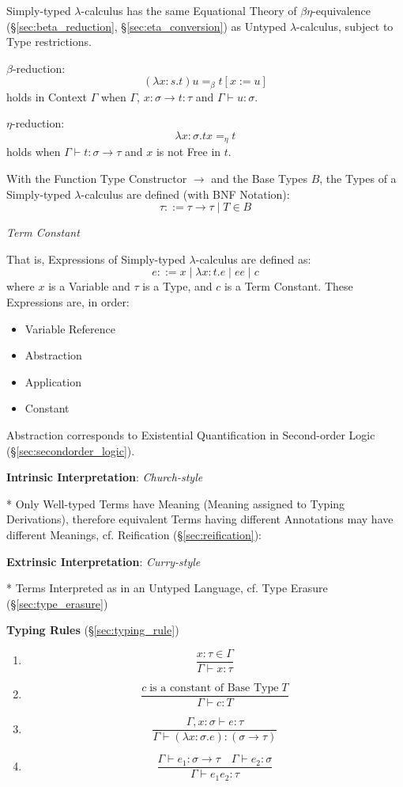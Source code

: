 Simply-typed $\lambda$-calculus has the same Equational Theory of
$\beta\eta$-equivalence (\S\ref{sec:beta_reduction},
\S\ref{sec:eta_conversion}) as Untyped $\lambda$-calculus, subject to
Type restrictions.

$\beta$-reduction:
\[
  (\lambda x:s.t)u =_\beta t[x := u]
\]
holds in Context $\Gamma$ when $\Gamma$, $x:\sigma \rightarrow t:\tau$
and $\Gamma \vdash u:\sigma$.

$\eta$-reduction:
\[
  \lambda x:\sigma .t x =_\eta t
\]
holds when $\Gamma \vdash t : \sigma \rightarrow \tau$ and $x$ is not
Free in $t$.

With the Function Type Constructor $\rightarrow$ and the Base Types
$B$, the Types of a Simply-typed $\lambda$-calculus are defined (with
BNF Notation):
\[
  \tau ::= \tau \rightarrow \tau \;|\; T \in B
\]

\emph{Term Constant}

That is, Expressions of Simply-typed $\lambda$-calculus are defined
as:
\[
  e ::= x \;|\; \lambda x:t.e \;|\; e e \;|\; c
\]
where $x$ is a Variable and $\tau$ is a Type, and $c$ is a Term
Constant. These Expressions are, in order:
\begin{itemize}
  \item Variable Reference
  \item Abstraction
  \item Application
  \item Constant
\end{itemize}

Abstraction corresponds to Existential Quantification in Second-order
Logic (\S\ref{sec:secondorder_logic}).



\textbf{Intrinsic Interpretation}: \emph{Church-style}

* Only Well-typed Terms have Meaning (Meaning assigned to Typing
Derivations), therefore equivalent Terms having different Annotations
may have different Meanings, cf. Reification
(\S\ref{sec:reification}):



\textbf{Extrinsic Interpretation}: \emph{Curry-style}

* Terms Interpreted as in an Untyped Language, cf. Type Erasure
(\S\ref{sec:type_erasure})



\textbf{Typing Rules} (\S\ref{sec:typing_rule})

\begin{enumerate}
\item
  \[
    {
      \frac
      {x : \tau \in \Gamma}
      {\Gamma \vdash x : \tau}
    }
  \]
\item
  \[
    {
      \frac
      {c \;\text{is a constant of Base Type}\; T}
      {\Gamma \vdash c:T}
    }
  \]
\item
  \[
    {
      \frac
      {\Gamma, x:\sigma \vdash e:\tau}
      {\Gamma \vdash (\lambda x:\sigma.e):(\sigma \rightarrow \tau)}
    }
  \]
\item
  \[
    {
      \frac
      {\Gamma \vdash e_1:\sigma \rightarrow \tau \quad
        \Gamma \vdash e_2:\sigma}
      {\Gamma \vdash e_1 e_2 : \tau}
    }
  \]
\end{enumerate}




